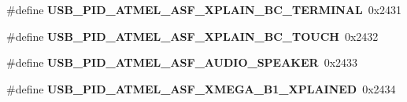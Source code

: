 \begin{DoxyCompactItemize}
\#define {\bfseries U\+S\+B\+\_\+\+P\+I\+D\+\_\+\+A\+T\+M\+E\+L\+\_\+\+A\+S\+F\+\_\+\+X\+P\+L\+A\+I\+N\+\_\+\+B\+C\+\_\+\+T\+E\+R\+M\+I\+N\+AL}~0x2431
\item 
\mbox{\label{group__usb__atmel__ids__group_ga37b99cc7bfd54bc7c3ffd687188e5437}} 
\#define {\bfseries U\+S\+B\+\_\+\+P\+I\+D\+\_\+\+A\+T\+M\+E\+L\+\_\+\+A\+S\+F\+\_\+\+X\+P\+L\+A\+I\+N\+\_\+\+B\+C\+\_\+\+T\+O\+U\+CH}~0x2432
\item 
\mbox{\label{group__usb__atmel__ids__group_ga1b6bfaf7852043aabaff755db9b6c0eb}} 
\#define {\bfseries U\+S\+B\+\_\+\+P\+I\+D\+\_\+\+A\+T\+M\+E\+L\+\_\+\+A\+S\+F\+\_\+\+A\+U\+D\+I\+O\+\_\+\+S\+P\+E\+A\+K\+ER}~0x2433
\item 
\mbox{\label{group__usb__atmel__ids__group_ga91ff45d2f9f01be7f423b074e5b66efc}} 
\#define {\bfseries U\+S\+B\+\_\+\+P\+I\+D\+\_\+\+A\+T\+M\+E\+L\+\_\+\+A\+S\+F\+\_\+\+X\+M\+E\+G\+A\+\_\+\+B1\+\_\+\+X\+P\+L\+A\+I\+N\+ED}~0x2434
\end{DoxyCompactItemize}
